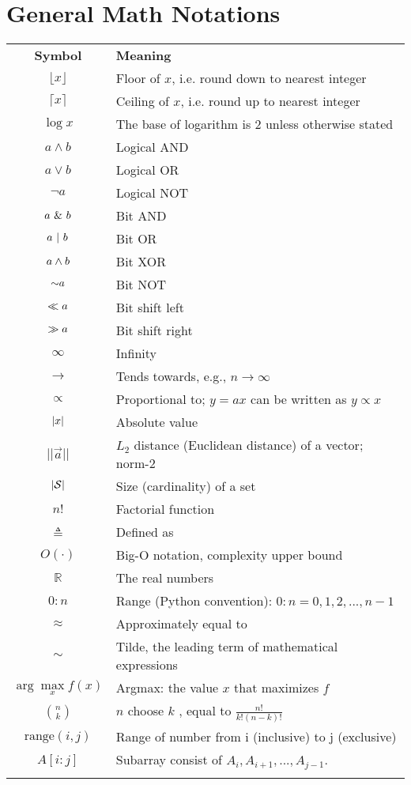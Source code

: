 \label{sec:Notation}

\section*{General Math Notations}

\begin{longtable}{cl}
\hline\noalign{\smallskip}
\textbf{Symbol} & \textbf{Meaning} \\
\noalign{\smallskip}\hline\noalign{\smallskip}
$\lfloor x \rfloor$ & Floor of $x$, i.e. round down to nearest integer\\
$\lceil x \rceil$ & Ceiling of $x$, i.e. round up to nearest integer\\
$\log x$ & The base of logarithm is 2 unless otherwise stated\\
$a \wedge b$ & Logical AND\\
$a \vee b$ & Logical OR\\
$\neg a $ & Logical NOT\\
$a\ \&\  b$ & Bit AND\\
$a \ |\  b$ & Bit OR\\
$a \wedge  b$ & Bit XOR\\
$\mathord{\sim} a$ & Bit NOT\\
$\ll a$ & Bit shift left\\
$\gg a$ & Bit shift right\\
$\infty$ & Infinity\\
$\rightarrow$ & Tends towards, e.g., $n \rightarrow \infty$\\
$\propto$ &Proportional to; $y = ax$ can be written as $y \propto x$\\
$\left\lvert x\right\rvert$ & Absolute value\\
$||\vec{a}||$ & $L_2$ distance (Euclidean distance) of a vector; norm-2 \\
$\left\lvert\mathcal{S}\right\rvert$ & Size (cardinality) of a set\\
$n!$ & Factorial function\\
$\triangleq$ & Defined as\\
$O(\cdot)$ & Big-O notation, complexity upper bound\\
$\mathbb{R}$ & The real numbers\\
$0:n$ & Range (Python convention): $0:n = {0, 1, 2,...,n-1}$\\
$\approx$ & Approximately equal to\\
$\sim$ & Tilde, the leading term of mathematical expressions \\
$\arg\max\limits_x f(x)$ & Argmax: the value $x$ that maximizes $f$\\
$\binom{n}{k}$ & $n$ choose $k$ , equal to $\frac{n!}{k!(n-k)!}$\\
$\text{range}(i,j)$ & Range of number from i (inclusive) to j (exclusive) \\
$A[i:j]$ & Subarray consist of $A_i, A_{i+1}, ..., A_{j-1}$.\\
\noalign{\smallskip}\hline\noalign{\smallskip}
\end{longtable}


\twocolumn
